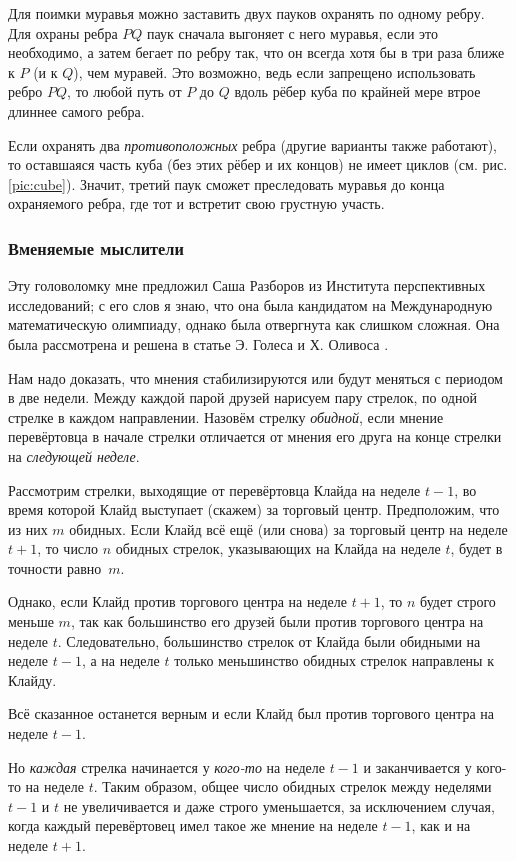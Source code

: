 Для поимки муравья можно заставить двух пауков охранять по одному ребру.
Для охраны ребра $PQ$ паук сначала выгоняет с него муравья, если это необходимо, а затем бегает по ребру так, что он всегда хотя бы в три раза ближе к $P$ (и к $Q$), чем муравей.
Это возможно, ведь если запрещено использовать ребро $PQ$, то любой путь от $P$ до $Q$ вдоль рёбер куба по крайней мере втрое длиннее самого ребра.

Если охранять два \emph{противоположных} ребра (другие варианты также работают), то оставшаяся часть куба (без этих рёбер и их концов) не имеет циклов (см. рис. \ref{pic:cube}).
Значит, третий паук сможет преследовать муравья до конца охраняемого ребра, где тот и встретит свою грустную участь.

\subsubsection*{Вменяемые мыслители}

Эту головоломку мне предложил Саша Разборов из Института перспективных исследований;
с его слов я знаю, что она была кандидатом на Международную математическую олимпиаду, однако была отвергнута как слишком сложная.
Она была рассмотрена и решена в статье Э. Голеса и Х. Оливоса \cite{31}.

Нам надо доказать, что мнения стабилизируются или будут меняться с периодом в две недели.
Между каждой парой друзей нарисуем пару стрелок, по одной стрелке в каждом направлении.
Назовём стрелку \emph{обидной}, если мнение перевёртовца в начале стрелки отличается от мнения его друга на конце стрелки на \emph{следующей неделе}.

Рассмотрим стрелки, выходящие от перевёртовца Клайда на неделе $t - 1$, во время которой Клайд выступает (скажем) за торговый центр.
Предположим, что из них $m$ обидных.
Если Клайд всё ещё (или снова) за торговый центр на неделе $t + 1$, то число  $n$ обидных стрелок, указывающих на Клайда на неделе $t$, будет в точности равно~$m$.

Однако, если Клайд против торгового центра на неделе $t + 1$, то $n$ будет строго меньше $m$, так как большинство его друзей были против торгового центра на неделе $t$.
Следовательно, большинство стрелок от Клайда были обидными на неделе $t - 1$, а на неделе $t$ только меньшинство обидных стрелок направлены к Клайду.

Всё сказанное останется верным и если Клайд был против торгового центра на неделе $t - 1$.

Но \emph{каждая} стрелка начинается у \emph{кого-то} на неделе $t - 1$ и заканчивается у кого-то на неделе $t$.
Таким образом, общее число обидных стрелок между неделями $t - 1$ и $t$ не увеличивается и даже строго уменьшается, за исключением случая, когда каждый перевёртовец имел такое же мнение на неделе $t - 1$, как и на неделе $t + 1$.

